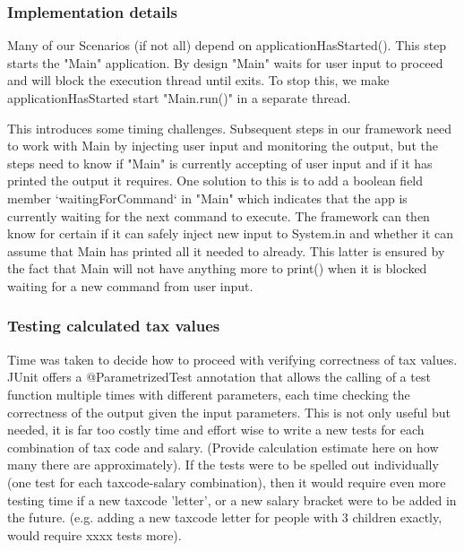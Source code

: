 

\subsubsection{Implementation details}


Many of our Scenarios (if not all) depend on applicationHasStarted(). This step starts the "Main" application. By design "Main" waits for user input to proceed and will block the execution thread until exits. To stop this, we make applicationHasStarted start "Main.run()" in a separate thread. 

This introduces some timing challenges. Subsequent steps in our framework need to work with Main by injecting user input and monitoring the output, but the steps need to know if "Main" is currently accepting of user input and if it has printed the output it requires. 
One solution to this is to add a boolean field member `waitingForCommand` in "Main" which indicates that the app is currently waiting for the next command to execute. The framework can then know for certain if it can safely inject new input to System.in and whether it can assume that Main has printed all it needed to already. This latter is ensured by the fact that Main will not have anything more to print() when it is blocked waiting for a new command from user input. 

\subsubsection{Testing calculated tax values}

Time was taken to decide how to proceed with verifying correctness of tax values. JUnit offers a \linebreak @ParametrizedTest annotation that allows the calling of a test function multiple times with different parameters, each time checking the correctness of the output given the input parameters. This is not only useful but needed, it is far too costly time and effort wise to write a new tests for each combination of tax code and salary. (Provide calculation estimate here on how many there are approximately).
If the tests were to be spelled out individually (one test for each taxcode-salary combination), then it would require even more testing time if a new taxcode 'letter', or a new salary bracket were to be added in the future. (e.g. adding a new taxcode letter for people with 3 children exactly, would require xxxx tests more). 

